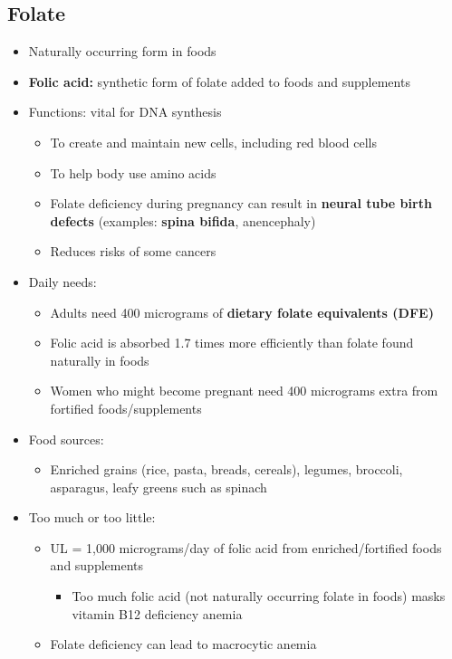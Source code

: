 \documentclass[12pt]{article}
\begin{document}
        \subsection{Folate}
            \begin{itemize}
                \item Naturally occurring form in foods
                \item \textbf{Folic acid:} synthetic form of folate added to foods and supplements
                \item Functions: vital for DNA synthesis
                    \begin{itemize}
                        \item To create and maintain new cells, including red blood cells
                        \item To help body use amino acids
                        \item Folate deficiency during pregnancy can result in \textbf{neural tube birth defects} (examples: \textbf{spina bifida}, anencephaly)
                        \item Reduces risks of some cancers
                    \end{itemize}
                \item Daily needs:
                    \begin{itemize}
                        \item Adults need 400 micrograms of \textbf{dietary folate equivalents (DFE)}
                        \item Folic acid is absorbed 1.7 times more efficiently than folate found naturally in foods
                        \item Women who might become pregnant need 400 micrograms extra from fortified foods/supplements
                    \end{itemize}
                \item Food sources:
                    \begin{itemize}
                        \item Enriched grains (rice, pasta, breads, cereals), legumes, broccoli, asparagus, leafy greens such as spinach
                    \end{itemize}
                \item Too much or too little:
                    \begin{itemize}
                        \item UL = 1,000 micrograms/day of folic acid from enriched/fortified foods and supplements
                            \begin{itemize}
                                \item Too much folic acid (not naturally occurring folate in foods) masks vitamin B12 deficiency anemia
                            \end{itemize}
                        \item Folate deficiency can lead to macrocytic anemia
                    \end{itemize}
            \end{itemize}
\end{document}
